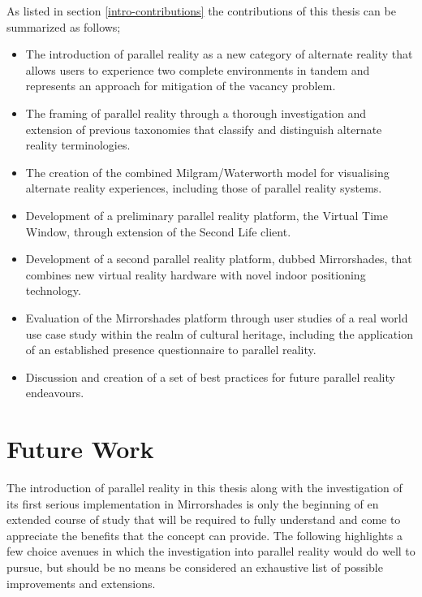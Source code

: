 As listed in section \ref{intro-contributions} the contributions of this thesis can be summarized as follows;

\begin{itemize}
	\item The introduction of parallel reality as a new category of alternate reality that allows users to experience two complete environments in tandem and represents an approach for mitigation of the vacancy problem.
	\item The framing of parallel reality through a thorough investigation and extension of previous taxonomies that classify and distinguish alternate reality terminologies.
	\item The creation of the combined Milgram/Waterworth model for visualising alternate reality experiences, including those of parallel reality systems.
	\item Development of a preliminary parallel reality platform, the Virtual Time Window, through extension of the Second Life client.
	\item Development of a second parallel reality platform, dubbed Mirrorshades, that combines new virtual reality hardware with novel indoor positioning technology.
	\item Evaluation of the Mirrorshades platform through user studies of a real world use case study within the realm of cultural heritage, including the application of an established presence questionnaire to parallel reality.
	\item Discussion and creation of a set of best practices for future parallel reality endeavours.
\end{itemize}


\section{Future Work}

The introduction of parallel reality in this thesis along with the investigation of its first serious implementation in Mirrorshades is only the beginning of en extended course of study that will be required to fully understand and come to appreciate the benefits that the concept can provide. The following highlights a few choice avenues in which the investigation into parallel reality would do well to pursue, but should be no means be considered an exhaustive list of possible improvements and extensions.

